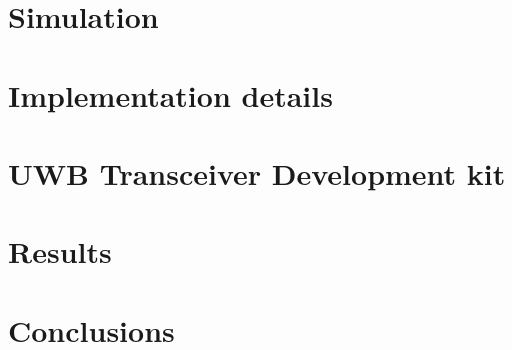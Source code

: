 \documentclass[journal,9pt,a4paper]{IEEEtran}
\begin{document}
\section{Simulation}\label{SIMULATION}


\section{Implementation details}\label{IMPLM_DET}


\section{UWB Transceiver Development kit}\label{UWB_CHAR}


\section{Results}\label{RESULTS}


\section{Conclusions}\label{CONCLUSIONS}



\let\oldUrl\url
\renewcommand{\url}[2]{\ifx#1\else[\href{#1}{Ref}]\fi}


\end{document}
